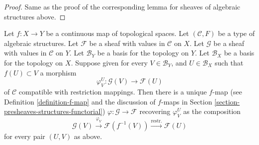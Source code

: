 \begin{proof}
Same as the proof of the corresponding lemma
for sheaves of algebraic structures above.
\end{proof}

\begin{lemma}
\label{lemma-f-map-basis-above-and-below-structures}
Let $f : X \to Y$ be a continuous map of topological spaces.
Let $(\mathcal{C}, F)$ be a type of algebraic structures.
Let $\mathcal{F}$ be a sheaf with values in $\mathcal{C}$ on $X$.
Let $\mathcal{G}$ be a sheaf with values in $\mathcal{C}$ on $Y$.
Let $\mathcal{B}_Y$ be a basis for the topology on $Y$.
Let $\mathcal{B}_X$ be a basis for the topology on $X$.
Suppose given for every $V \in \mathcal{B}_Y$, and
$U \in \mathcal{B}_X$ such that $f(U) \subset V$ a morphism
$$
\varphi_V^U :
\mathcal{G}(V)
\longrightarrow
\mathcal{F}(U)
$$
of $\mathcal{C}$ compatible with restriction mappings. 
Then there is a unique $f$-map (see
Definition \ref{definition-f-map} and the discussion
of $f$-maps in Section \ref{section-presheaves-structures-functorial})
$\varphi : \mathcal{G} \to \mathcal{F}$
recovering $\varphi_V^U$ as the composition
$$
\mathcal{G}(V) \xrightarrow{\varphi_V}
\mathcal{F}(f^{-1}(V)) \xrightarrow{\text{restr.}}
\mathcal{F}(U)
$$
for every pair $(U, V)$ as above.
\end{lemma}

